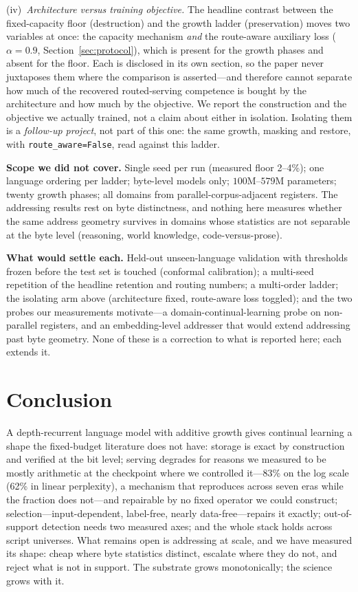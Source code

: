 \documentclass[11pt]{article}
\theoremstyle{definition}\newtheorem{definition}{Definition}
\theoremstyle{remark}\newtheorem{remark}{Remark}
\begin{document}
(iv)~\emph{Architecture versus training objective.} The headline contrast between the
fixed-capacity floor (destruction) and the growth ladder (preservation) moves two
variables at once: the capacity mechanism \emph{and} the route-aware auxiliary loss
($\alpha=0.9$, Section~\ref{sec:protocol}), which is present for the growth phases and
absent for the floor. Each is disclosed in its own section, so the paper never juxtaposes
them where the comparison is asserted---and therefore cannot separate how much of the
recovered routed-serving competence is bought by the architecture and how much by the
objective. We report the construction and the objective we actually trained, not a claim
about either in isolation. Isolating them is a \emph{follow-up project}, not part of this
one: the same growth, masking and restore, with \texttt{route\_aware=False}, read against
this ladder.

\textbf{Scope we did not cover.} Single seed per run (measured floor 2--4\%); one
language ordering per ladder; byte-level models only; $100$M--$579$M parameters; twenty
growth phases; all domains from parallel-corpus-adjacent registers. The addressing results
rest on byte distinctness, and nothing here measures whether the same address geometry
survives in domains whose statistics are not separable at the byte level (reasoning, world
knowledge, code-versus-prose).

\textbf{What would settle each.} Held-out unseen-language validation with thresholds
frozen before the test set is touched (conformal calibration); a multi-seed repetition of
the headline retention and routing numbers; a multi-order ladder; the isolating arm above
(architecture fixed, route-aware loss toggled); and the two probes our measurements motivate---a domain-continual-learning probe on non-parallel registers, and
an embedding-level addresser that would extend addressing past byte geometry. None of
these is a correction to what is reported here; each extends it.

\section{Conclusion}
\label{sec:conclusion}

A depth-recurrent language model with additive growth gives continual learning a shape
the fixed-budget literature does not have: storage is exact by construction and verified
at the bit level; serving degrades for reasons we measured to be mostly arithmetic at the checkpoint where we
controlled it---83\% on the log scale (62\% in linear perplexity), a mechanism that reproduces across seven eras
while the fraction does not---and repairable by no fixed operator we could construct; selection---input-dependent,
label-free, nearly data-free---repairs it exactly; out-of-support detection needs two
measured axes; and the whole stack holds across script universes. What remains open is
addressing at scale, and we have measured its shape: cheap where byte statistics
distinct, escalate where they do not, and reject what is not in support. The substrate
grows monotonically; the science grows with it.
\end{document}
